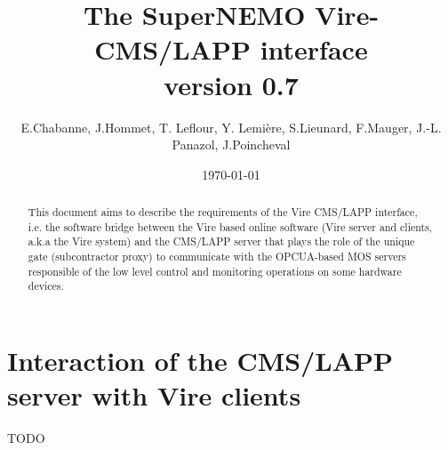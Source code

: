 \documentclass[a4paper,11pt,twoside]{article}
\title{The SuperNEMO Vire-CMS/LAPP interface\\version 0.7}
\author{E.Chabanne, J.Hommet, T. Leflour, Y. Lemière,
  S.Lieunard, F.Mauger, J.-L. Panazol, J.Poincheval}
\date{\today}
\begin{document}
\thispagestyle{empty}
\maketitle
\begin{abstract}
This document aims  to describe the requirements of  the Vire CMS/LAPP
interface,  i.e. the  software bridge  between the  Vire based  online
software  (Vire server  and clients,  a.k.a the  Vire system)  and the
CMS/LAPP server  that plays  the role  of the  unique gate  (subcontractor proxy) to
communicate with  the OPCUA-based MOS  servers responsible of  the low
level control and monitoring operations on some hardware devices.
\end{abstract}
\vfill
\pagebreak

\tableofcontents
\vfill
\pagebreak

\listoffigures
\vfill
\pagebreak

\listoftables
\vfill
\pagebreak
\clearpage


\vfill
\pagebreak
\clearpage


\vfill
\pagebreak
\clearpage

% 
\section{Interaction of the CMS/LAPP server with Vire clients}

TODO
\vfill
\pagebreak
\clearpage

\appendix




%



\end{document}
